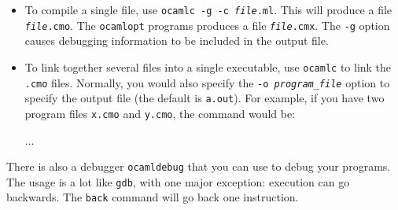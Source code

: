 \begin{itemize}

\item{{To compile a single file, use \texttt{ocamlc -g -c
\emph{file}.ml}.  This will produce a file \texttt{\emph{file}.cmo}.  The
\texttt{ocamlopt} programs produces a file \texttt{\emph{file}.cmx}.  The
\texttt{-g} option causes debugging
information to be included in the output file.}}

\item{To link together several files into a single executable, use
\texttt{ocamlc} to link the \texttt{.cmo} files.  Normally, you would also
specify the \texttt{-o \emph{program\_file}} option to specify the output
file (the default is \texttt{a.out}).  For example, if you have two program
files \texttt{x.cmo} and \texttt{y.cmo}, the command would be:

\begin{ocaml}
...
\end{ocaml}}
\end{itemize}
%
There is also a debugger \texttt{ocamldebug} that you can use to debug
your programs.  The usage is a lot like \texttt{gdb}, with one major
exception: execution can go backwards.  The \texttt{back} command will
go back one instruction.
